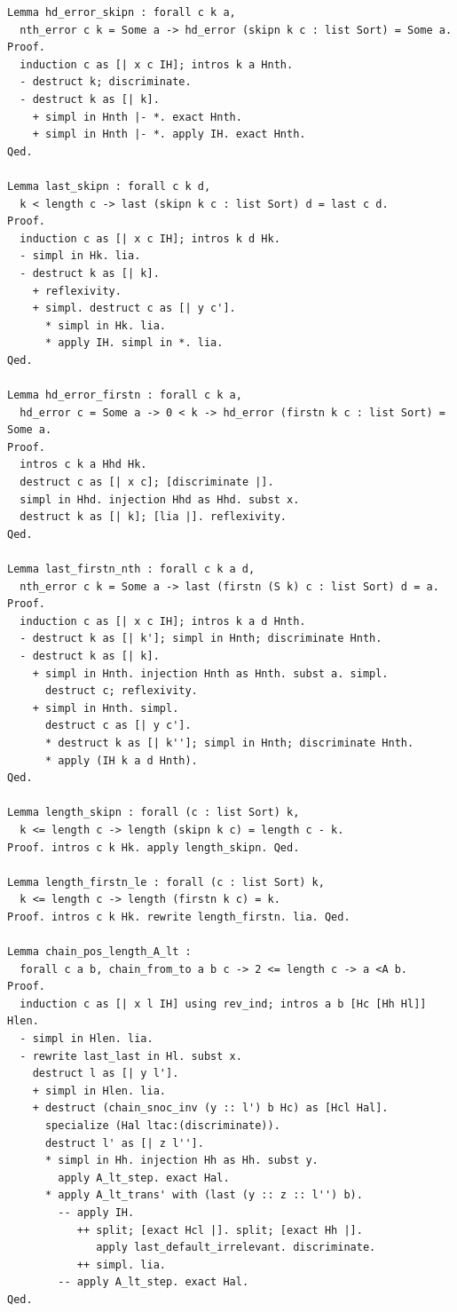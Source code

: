 \begin{latin}
\begin{verbatim}
Lemma hd_error_skipn : forall c k a,
  nth_error c k = Some a -> hd_error (skipn k c : list Sort) = Some a.
Proof.
  induction c as [| x c IH]; intros k a Hnth.
  - destruct k; discriminate.
  - destruct k as [| k].
    + simpl in Hnth |- *. exact Hnth.
    + simpl in Hnth |- *. apply IH. exact Hnth.
Qed.

Lemma last_skipn : forall c k d,
  k < length c -> last (skipn k c : list Sort) d = last c d.
Proof.
  induction c as [| x c IH]; intros k d Hk.
  - simpl in Hk. lia.
  - destruct k as [| k].
    + reflexivity.
    + simpl. destruct c as [| y c'].
      * simpl in Hk. lia.
      * apply IH. simpl in *. lia.
Qed.

Lemma hd_error_firstn : forall c k a,
  hd_error c = Some a -> 0 < k -> hd_error (firstn k c : list Sort) = Some a.
Proof.
  intros c k a Hhd Hk.
  destruct c as [| x c]; [discriminate |].
  simpl in Hhd. injection Hhd as Hhd. subst x.
  destruct k as [| k]; [lia |]. reflexivity.
Qed.

Lemma last_firstn_nth : forall c k a d,
  nth_error c k = Some a -> last (firstn (S k) c : list Sort) d = a.
Proof.
  induction c as [| x c IH]; intros k a d Hnth.
  - destruct k as [| k']; simpl in Hnth; discriminate Hnth.
  - destruct k as [| k].
    + simpl in Hnth. injection Hnth as Hnth. subst a. simpl.
      destruct c; reflexivity.
    + simpl in Hnth. simpl.
      destruct c as [| y c'].
      * destruct k as [| k'']; simpl in Hnth; discriminate Hnth.
      * apply (IH k a d Hnth).
Qed.

Lemma length_skipn : forall (c : list Sort) k,
  k <= length c -> length (skipn k c) = length c - k.
Proof. intros c k Hk. apply length_skipn. Qed.

Lemma length_firstn_le : forall (c : list Sort) k,
  k <= length c -> length (firstn k c) = k.
Proof. intros c k Hk. rewrite length_firstn. lia. Qed.

Lemma chain_pos_length_A_lt :
  forall c a b, chain_from_to a b c -> 2 <= length c -> a <A b.
Proof.
  induction c as [| x l IH] using rev_ind; intros a b [Hc [Hh Hl]] Hlen.
  - simpl in Hlen. lia.
  - rewrite last_last in Hl. subst x.
    destruct l as [| y l'].
    + simpl in Hlen. lia.
    + destruct (chain_snoc_inv (y :: l') b Hc) as [Hcl Hal].
      specialize (Hal ltac:(discriminate)).
      destruct l' as [| z l''].
      * simpl in Hh. injection Hh as Hh. subst y.
        apply A_lt_step. exact Hal.
      * apply A_lt_trans' with (last (y :: z :: l'') b).
        -- apply IH.
           ++ split; [exact Hcl |]. split; [exact Hh |].
              apply last_default_irrelevant. discriminate.
           ++ simpl. lia.
        -- apply A_lt_step. exact Hal.
Qed.


\end{verbatim}
\end{latin}
